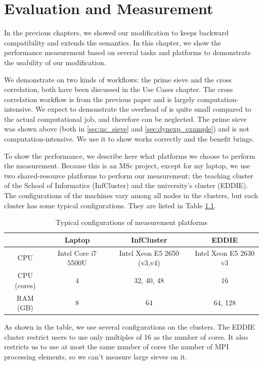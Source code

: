 \chapter{Evaluation and Measurement}
In the previous chapters, we showed our modification to \dpy keeps backward compatibility and extends the semantics. In this chapter, we show the performance measurement based on several tasks and platforms to demonstrate the usability of our modification.

We demonstrate on two kinds of workflows: the prime sieve and the cross correlation, both have been discussed in the Use Cases chapter. The cross correlation workflow is from the previous \dpy paper and is largely computation-intensive. We expect to demonstrate the overhead of \tincdep is quite small compared to the actual computational job, and therefore can be neglected. The prime sieve was shown above (both in \ref{sec:uc_sieve} and \ref{sec:dynexp_example}) and is not computation-intensive. We use it to show \tdynexp works correctly and the benefit \tdynexp brings.

To show the performance, we describe here what platforms we choose to perform the measurement. Because this is an MSc project, except for my laptop, we use two shared-resource platforms to perform our measurement: the teaching cluster of the School of Informatics (InfCluster) and the university's cluster (EDDIE).
The configurations of the machines vary among all nodes in the clusters, but each cluster has some typical configurations. They are listed in Table \ref{tbl:list_measurement}.

\begin{table}[h]
\centering
\begin{tabular}{|c|c|c|c|}
\hline
 & Laptop & InfCluster & EDDIE \\ \hline
CPU & Intel Core i7 5500U & Intel Xeon E5 2650 (v3,v4) & Intel Xeon E5 2630 v3 \\ \hline
CPU (cores) & 4 & 32, 40, 48 & 16 \\ \hline
RAM (GB) & 8 & 64 & 64, 128 \\ \hline
\end{tabular}
\caption{Typical configurations of measurement platforms}
\label{tbl:list_measurement}
\end{table}

As shown in the table, we use several configurations on the clusters. The EDDIE cluster restrict users to use only multiples of 16 as the number of cores. It also restricts us to use at most the same number of cores the number of MPI processing elements, so we can't measure large sieves on it.

